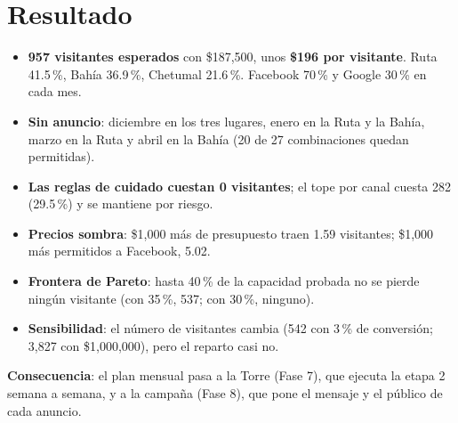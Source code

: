 \section*{Resultado}
\begin{itemize}
\item \textbf{957 visitantes esperados} con \$187,500, unos \textbf{\$196 por visitante}. Ruta 41.5\,\%, Bahía 36.9\,\%,
  Chetumal 21.6\,\%. Facebook 70\,\% y Google 30\,\% en cada mes.
\item \textbf{Sin anuncio}: diciembre en los tres lugares, enero en la Ruta y la Bahía, marzo en la Ruta y abril en la Bahía (20
  de 27 combinaciones quedan permitidas).
\item \textbf{Las reglas de cuidado cuestan 0 visitantes}; el tope por canal cuesta 282 (29.5\,\%) y se mantiene por riesgo.
\item \textbf{Precios sombra}: \$1,000 más de presupuesto traen 1.59 visitantes; \$1,000 más permitidos a Facebook, 5.02.
\item \textbf{Frontera de Pareto}: hasta 40\,\% de la capacidad probada no se pierde ningún visitante (con 35\,\%, 537; con
  30\,\%, ninguno).
\item \textbf{Sensibilidad}: el número de visitantes cambia (542 con 3\,\% de conversión; 3,827 con \$1,000,000), pero el
  reparto casi no.
\end{itemize}

\textbf{Consecuencia}: el plan mensual pasa a la Torre (Fase 7), que ejecuta la etapa 2 semana a semana, y a la campaña
(Fase 8), que pone el mensaje y el público de cada anuncio.
